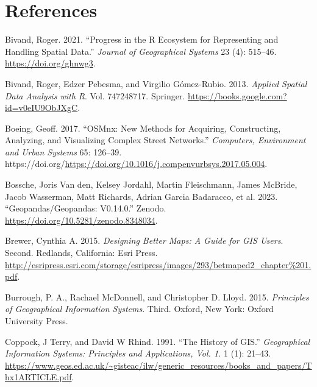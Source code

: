 \documentclass[
  letterpaper,
]{krantz}
\newlength{\cslhangindent}
\newenvironment{CSLReferences}[2] %
 {\begin{list}{}{%
  \setlength{\itemindent}{0pt}
  \setlength{\leftmargin}{0pt}
  \setlength{\parsep}{0pt}
  \ifodd #1
   \setlength{\leftmargin}{\cslhangindent}
   \setlength{\itemindent}{-1\cslhangindent}
  \fi
  \setlength{\itemsep}{#2\baselineskip}}}
 {\end{list}}
\begin{document}

\chapter*{References}\label{references}


\label{refs}
\begin{CSLReferences}{1}{0}
Bivand, Roger. 2021. {``Progress in the {R} Ecosystem for Representing
and Handling Spatial Data.''} \emph{Journal of Geographical Systems} 23
(4): 515--46. \url{https://doi.org/ghnwg3}.

Bivand, Roger, Edzer Pebesma, and Virgilio Gómez-Rubio. 2013.
\emph{Applied Spatial Data Analysis with {R}}. Vol. 747248717.
{Springer}. \url{https://books.google.com?id=v0eIU9ObJXgC}.

Boeing, Geoff. 2017. {``OSMnx: New Methods for Acquiring, Constructing,
Analyzing, and Visualizing Complex Street Networks.''} \emph{Computers,
Environment and Urban Systems} 65: 126--39.
https://doi.org/\url{https://doi.org/10.1016/j.compenvurbsys.2017.05.004}.

Bossche, Joris Van den, Kelsey Jordahl, Martin Fleischmann, James
McBride, Jacob Wasserman, Matt Richards, Adrian Garcia Badaracco, et al.
2023. {``Geopandas/Geopandas: V0.14.0.''} Zenodo.
\url{https://doi.org/10.5281/zenodo.8348034}.

Brewer, Cynthia A. 2015. \emph{Designing {Better Maps}: {A Guide} for
{GIS Users}}. Second. {Redlands, California}: {Esri Press}.
\url{http://esripress.esri.com/storage/esripress/images/293/betmaped2_chapter\%201.pdf}.

Burrough, P. A., Rachael McDonnell, and Christopher D. Lloyd. 2015.
\emph{Principles of Geographical Information Systems}. Third. {Oxford,
New York}: {Oxford University Press}.

Coppock, J Terry, and David W Rhind. 1991. {``The History of {GIS}.''}
\emph{Geographical Information Systems: Principles and Applications,
Vol. 1.} 1 (1): 21--43.
\url{https://www.geos.ed.ac.uk/~gisteac/ilw/generic_resources/books_and_papers/Thx1ARTICLE.pdf}.


\end{CSLReferences}
\end{document}
